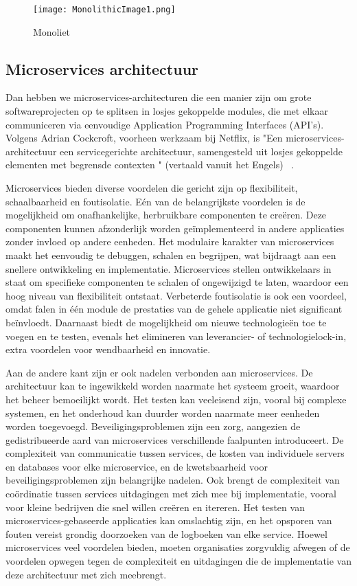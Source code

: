 \begin{figure}[h]
	\centering	
	\texttt{[image: MonolithicImage1.png]} 
	\caption{Monoliet} 
	\label{fig:Monoliet} 
\end{figure}
\FloatBarrier

\subsection*{Microservices architectuur}
Dan hebben we microservices-architecturen die een manier zijn  om grote softwareprojecten op te splitsen in losjes gekoppelde modules, die met elkaar communiceren via eenvoudige Application Programming Interfaces (API's). Volgens Adrian Cockcroft, voorheen werkzaam bij Netflix, is "Een microservices-architectuur een servicegerichte architectuur, samengesteld uit losjes gekoppelde elementen met begrensde contexten " (vertaald vanuit het Engels) ~\autocite{Richardson2018}.

Microservices bieden diverse voordelen die gericht zijn op flexibiliteit, schaalbaarheid en foutisolatie. Eén van de belangrijkste voordelen is de mogelijkheid om onafhankelijke, herbruikbare componenten te creëren. Deze componenten kunnen afzonderlijk worden geïmplementeerd in andere applicaties zonder invloed op andere eenheden. Het modulaire karakter van microservices maakt het eenvoudig te debuggen, schalen en begrijpen, wat bijdraagt aan een snellere ontwikkeling en implementatie. 
Microservices stellen ontwikkelaars in staat om specifieke componenten te schalen of ongewijzigd te laten, waardoor een hoog niveau van flexibiliteit ontstaat. Verbeterde foutisolatie is ook een voordeel, omdat falen in één module de prestaties van de gehele applicatie niet significant beïnvloedt. Daarnaast biedt de mogelijkheid om nieuwe technologieën toe te voegen en te testen, evenals het elimineren van leverancier- of technologielock-in, extra voordelen voor wendbaarheid en innovatie. 

Aan de andere kant zijn er ook nadelen verbonden aan microservices. De architectuur kan te ingewikkeld worden naarmate het systeem groeit, waardoor het beheer bemoeilijkt wordt. Het testen kan veeleisend zijn, vooral bij complexe systemen, en het onderhoud kan duurder worden naarmate meer eenheden worden toegevoegd. Beveiligingsproblemen zijn een zorg, aangezien de gedistribueerde aard van microservices verschillende faalpunten introduceert. 
De complexiteit van communicatie tussen services, de kosten van individuele servers en databases voor elke microservice, en de kwetsbaarheid voor beveiligingsproblemen zijn belangrijke nadelen. Ook brengt de complexiteit van coördinatie tussen services uitdagingen met zich mee bij implementatie, vooral voor kleine bedrijven die snel willen creëren en itereren. Het testen van microservices-gebaseerde applicaties kan omslachtig zijn, en het opsporen van fouten vereist grondig doorzoeken van de logboeken van elke service. 
Hoewel microservices veel voordelen bieden, moeten organisaties zorgvuldig afwegen of de voordelen opwegen tegen de complexiteit en uitdagingen die de implementatie van deze architectuur met zich meebrengt.

